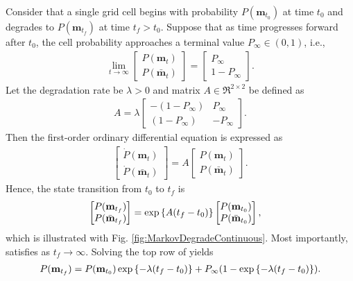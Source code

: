 Consider that a single grid cell begins with probability $P(\mathbf{m}_{t_0})$ at time $t_0$ and degrades to $P(\mathbf{m}_{t_f})$ at time $t_f>t_0$. Suppose that as time progresses forward after $t_0$, the cell probability approaches a terminal value $P_\infty\in(0,1)$, i.e.,
\begin{align}
\label{eqn:DegradationQualification}
\lim_{t\rightarrow\infty}\begin{bmatrix}
P(\mathbf{m}_{t})
\\
P(\bar{\mathbf{m}}_{t})
\end{bmatrix}
=
\begin{bmatrix}
P_\infty
\\
1-P_\infty
\end{bmatrix}.
\end{align}
Let the degradation rate be $\lambda>0$ and matrix $A\in\Re^{2\times2}$ be defined as
\begin{align}
A=\lambda
\begin{bmatrix}
-(1-P_\infty) & P_\infty
\\
(1-P_\infty) & -P_\infty
\end{bmatrix}.
\end{align}
Then the first-order ordinary differential equation is expressed as
\begin{align}
\begin{bmatrix}
\dot{P}(\mathbf{m}_{t})
\\
\dot{P}(\bar{\mathbf{m}}_{t})
\end{bmatrix}
=
A
\begin{bmatrix}
P(\mathbf{m}_{t})
\\
P(\bar{\mathbf{m}}_{t})
\end{bmatrix}.
\end{align}
Hence, the state transition from $t_0$ to $t_f$ is
\begin{align}
\label{eqn:DegradeStateTransition}
\begin{bmatrix}
P(\mathbf{m}_{t_f})
\\
P(\bar{\mathbf{m}}_{t_f})
\end{bmatrix}
&=
\exp\left\{ A(t_f-t_0) \right\}
\begin{bmatrix}
P(\mathbf{m}_{t_0})
\\
P(\bar{\mathbf{m}}_{t_0})
\end{bmatrix},
\end{align}
which is illustrated with Fig. \ref{fig:MarkovDegradeContinuous}. Most importantly,  satisfies  as $t_f\rightarrow\infty$. Solving the top row of  yields
\begin{align}
\label{eqn:CellDegradationScalar}
P(\mathbf{m}_{t_f})=P(\mathbf{m}_{t_0})\exp\left\{ -\lambda (t_f-t_0) \right\}+P_\infty(1-\exp\left\{ -\lambda (t_f-t_0) \right\}).
\end{align}

